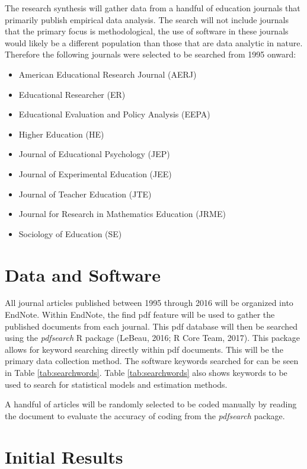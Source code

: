 \documentclass[english,man]{apa6}
\providecommand{\tightlist}{%
  \setlength{\itemsep}{0pt}\setlength{\parskip}{0pt}}
\theoremstyle{definition}
\theoremstyle{definition}
\theoremstyle{remark}
\begin{document}
The research synthesis will gather data from a handful of education
journals that primarily publish empirical data analysis. The search will
not include journals that the primary focus is methodological, the use
of software in these journals would likely be a different population
than those that are data analytic in nature. Therefore the following
journals were selected to be searched from 1995 onward:

\begin{itemize}
\tightlist
\item
  American Educational Research Journal (AERJ)
\item
  Educational Researcher (ER)
\item
  Educational Evaluation and Policy Analysis (EEPA)
\item
  Higher Education (HE)
\item
  Journal of Educational Psychology (JEP)
\item
  Journal of Experimental Education (JEE)
\item
  Journal of Teacher Education (JTE)
\item
  Journal for Research in Mathematics Education (JRME)
\item
  Sociology of Education (SE)
\end{itemize}

\section{Data and Software}\label{data-and-software}

All journal articles published between 1995 through 2016 will be
organized into EndNote. Within EndNote, the find pdf feature will be
used to gather the published documents from each journal. This pdf
database will then be searched using the \emph{pdfsearch} R package
(LeBeau, 2016; R Core Team, 2017). This package allows for keyword
searching directly within pdf documents. This will be the primary data
collection method. The software keywords searched for can be seen in
Table \ref{tab:searchwords}. Table \ref{tab:searchwords} also shows
keywords to be used to search for statistical models and estimation
methods.

A handful of articles will be randomly selected to be coded manually by
reading the document to evaluate the accuracy of coding from the
\emph{pdfsearch} package.

\section{Initial Results}\label{initial-results}
\end{document}
